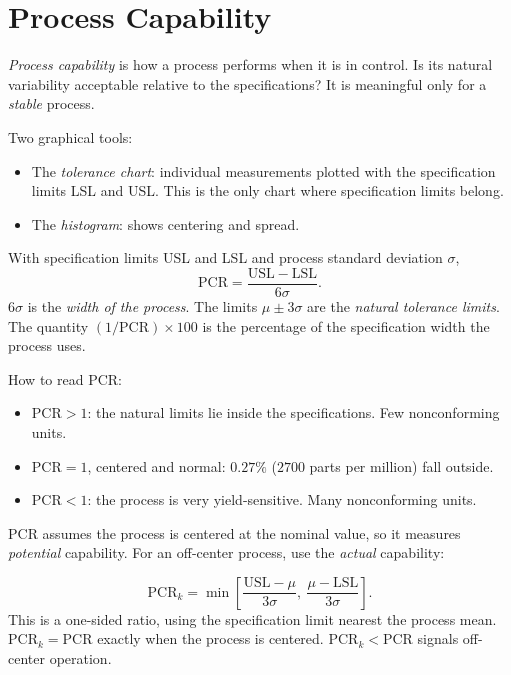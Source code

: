 \section{Process Capability}

\emph{Process capability} is how a process performs when it is in control. Is its natural variability acceptable relative to the specifications? It is meaningful only for a \emph{stable} process.

Two graphical tools:
\begin{itemize}
  \item The \emph{tolerance chart}: individual measurements plotted with the specification limits LSL and USL. This is the only chart where specification limits belong.
  \item The \emph{histogram}: shows centering and spread.
\end{itemize}

\begin{definition}
With specification limits USL and LSL and process standard deviation $\sigma$,
\[ \mathrm{PCR}=\frac{\mathrm{USL}-\mathrm{LSL}}{6\sigma}. \]
$6\sigma$ is the \emph{width of the process}. The limits $\mu\pm3\sigma$ are the \emph{natural tolerance limits}. The quantity $(1/\mathrm{PCR})\times100$ is the percentage of the specification width the process uses.
\end{definition}

How to read PCR:
\begin{itemize}
  \item $\mathrm{PCR}>1$: the natural limits lie inside the specifications. Few nonconforming units.
  \item $\mathrm{PCR}=1$, centered and normal: $0.27\%$ ($2700$ parts per million) fall outside.
  \item $\mathrm{PCR}<1$: the process is very yield-sensitive. Many nonconforming units.
\end{itemize}
PCR assumes the process is centered at the nominal value, so it measures \emph{potential} capability. For an off-center process, use the \emph{actual} capability:

\begin{definition}[PCR$_k$]
\[ \mathrm{PCR}_k=\min\left[\frac{\mathrm{USL}-\mu}{3\sigma},\ \frac{\mu-\mathrm{LSL}}{3\sigma}\right]. \]
This is a one-sided ratio, using the specification limit nearest the process mean. $\mathrm{PCR}_k=\mathrm{PCR}$ exactly when the process is centered. $\mathrm{PCR}_k<\mathrm{PCR}$ signals off-center operation.
\end{definition}

